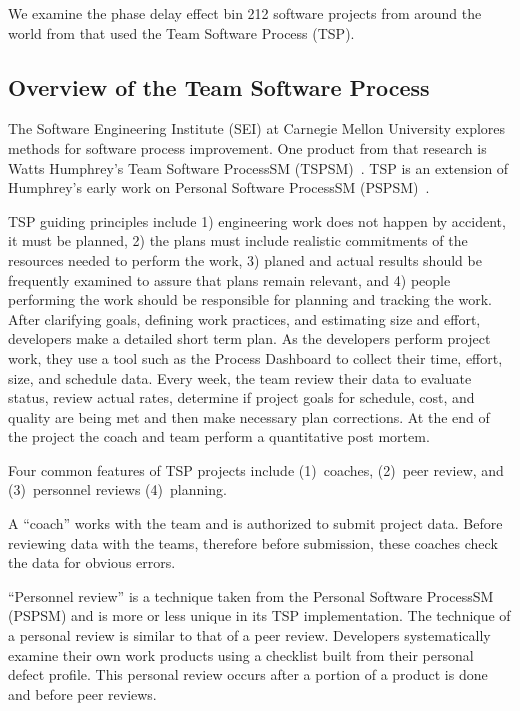 We examine the phase delay effect bin
212 software projects from around the world from 
 that used the Team Software Process (TSP). 

\subsection{Overview of the Team Software Process}
The Software Engineering Institute (SEI) at
Carnegie Mellon University explores methods for software process improvement.
One product from that research is  
Watts Humphrey's  Team Software ProcessSM (TSPSM)~\cite{tsp00}. TSP is an extension of Humphrey's early
work on Personal Software
ProcessSM (PSPSM)~\cite{psp05}.




TSP guiding principles include 1) engineering work does not happen by accident, it must be planned, 2) the plans must include realistic commitments of the resources needed to perform the work, 3) planed and actual results should be frequently examined to assure that plans remain relevant, and 4) people performing the work should be responsible for planning and tracking the work. After clarifying goals, defining work practices, and estimating size and effort, developers make a detailed short term plan. As the developers perform project work, they use a tool such as the Process Dashboard to collect their time, effort, size, and schedule data. Every week, the team review their data to evaluate status, review actual rates, determine if project goals for schedule, cost, and quality are being met and then make necessary plan corrections. At the end of the project the coach and team perform a quantitative post mortem.

Four common features of TSP projects include (1)~coaches,
(2)~peer review, and  (3)~personnel reviews (4)~planning.
 
A ``coach'' works with the team and is authorized to submit project data.
Before reviewing data with the teams, therefore before submission,
these coaches check the data for obvious errors.

``Personnel review'' is a technique taken  from the Personal Software
ProcessSM (PSPSM) and is more or less unique in its TSP implementation. The technique of a personal review is similar to that of a peer review. Developers systematically examine their own work products using a checklist built from their personal defect profile. This personal review occurs after a portion of a product is done and before peer reviews. 

